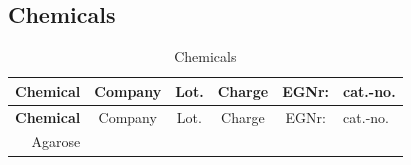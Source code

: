 \documentclass[11pt,singlespacinge,twoside]{reedthesis} %
\begin{document}
\hypertarget{mat-chem}{%
\subsection{Chemicals}\label{mat-chem}}
\begin{longtable}[]{@{}rccccl@{}}
\caption{\label{tab:mat-chem} Chemicals}\tabularnewline
\toprule
\begin{minipage}[b]{0.19\columnwidth}\raggedleft
\textbf{Chemical}\strut
\end{minipage} & \begin{minipage}[b]{0.15\columnwidth}\centering
Company\strut
\end{minipage} & \begin{minipage}[b]{0.12\columnwidth}\centering
Lot.\strut
\end{minipage} & \begin{minipage}[b]{0.12\columnwidth}\centering
Charge\strut
\end{minipage} & \begin{minipage}[b]{0.12\columnwidth}\centering
EGNr:\strut
\end{minipage} & \begin{minipage}[b]{0.14\columnwidth}\raggedright
cat.-no.\strut
\end{minipage}\tabularnewline
\midrule
\endfirsthead
\toprule
\begin{minipage}[b]{0.19\columnwidth}\raggedleft
\textbf{Chemical}\strut
\end{minipage} & \begin{minipage}[b]{0.15\columnwidth}\centering
Company\strut
\end{minipage} & \begin{minipage}[b]{0.12\columnwidth}\centering
Lot.\strut
\end{minipage} & \begin{minipage}[b]{0.12\columnwidth}\centering
Charge\strut
\end{minipage} & \begin{minipage}[b]{0.12\columnwidth}\centering
EGNr:\strut
\end{minipage} & \begin{minipage}[b]{0.14\columnwidth}\raggedright
cat.-no.\strut
\end{minipage}\tabularnewline
\midrule
\endhead
\begin{minipage}[t]{0.19\columnwidth}\raggedleft
Agarose\strut
\end{minipage} & \begin{minipage}[t]{0.15\columnwidth}\centering

\end{minipage}
\end{longtable}
\end{document}
